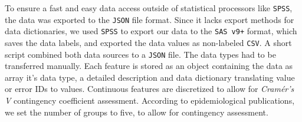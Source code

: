 \documentclass[journal]{style/vgtc} 			          %
\begin{document}
To ensure a fast and easy data access outside of statistical processors like \texttt{SPSS}, the data was exported to the \texttt{JSON} file format.
%
Since it lacks export methods for data dictionaries, we used \texttt{SPSS} to export our data to the \texttt{SAS v9+} format, which saves the data labels, and exported the data values as non-labeled \texttt{CSV}.
%
A short script combined both data sources to a \texttt{JSON} file.
%
The data types had to be transferred manually.
%
Each feature is stored as an object containing the data as array it's data type, a detailed description and data dictionary translating value or error IDs to values.
%
Continuous features are discretized to allow for \emph{Cram\'{e}r's V} contingency coefficient assessment.
%
According to epidemiological publications, we set the number of groups to five, to allow for contingency assessment.
\end{document}
